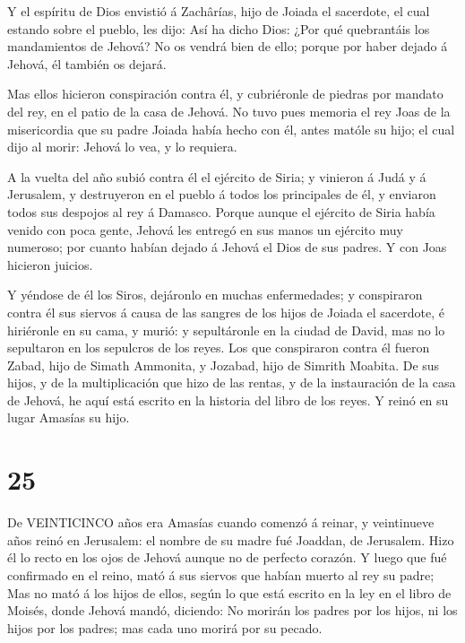  Y el espíritu de Dios envistió á Zachârías, hijo de Joiada
el sacerdote, el cual estando sobre el pueblo, les dijo: Así ha dicho
Dios: ¿Por qué quebrantáis los mandamientos de Jehová? No os vendrá bien
de ello; porque por haber dejado á Jehová, él también os dejará.

 Mas ellos hicieron conspiración contra él, y cubriéronle
de piedras por mandato del rey, en el patio de la casa de Jehová.
 No tuvo pues memoria el rey Joas de la misericordia que su
padre Joiada había hecho con él, antes matóle su hijo; el cual dijo al
morir: Jehová lo vea, y lo requiera.

 A la vuelta del año subió contra él el ejército de Siria;
y vinieron á Judá y á Jerusalem, y destruyeron en el pueblo á todos los
principales de él, y enviaron todos sus despojos al rey á Damasco.
 Porque aunque el ejército de Siria había venido con poca
gente, Jehová les entregó en sus manos un ejército muy numeroso; por
cuanto habían dejado á Jehová el Dios de sus padres. Y con Joas hicieron
juicios.

 Y yéndose de él los Siros, dejáronlo en muchas
enfermedades; y conspiraron contra él sus siervos á causa de las sangres
de los hijos de Joiada el sacerdote, é hiriéronle en su cama, y murió: y
sepultáronle en la ciudad de David, mas no lo sepultaron en los
sepulcros de los reyes.  Los que conspiraron contra él
fueron Zabad, hijo de Simath Ammonita, y Jozabad, hijo de Simrith
Moabita.  De sus hijos, y de la multiplicación que hizo de
las rentas, y de la instauración de la casa de Jehová, he aquí está
escrito en la historia del libro de los reyes. Y reinó en su lugar
Amasías su hijo.

\hypertarget{section-24}{%
\section{25}\label{section-24}}

 De VEINTICINCO años era Amasías cuando comenzó á reinar, y
veintinueve años reinó en Jerusalem: el nombre de su madre fué Joaddan,
de Jerusalem.  Hizo él lo recto en los ojos de Jehová aunque
no de perfecto corazón.  Y luego que fué confirmado en el
reino, mató á sus siervos que habían muerto al rey su padre;
 Mas no mató á los hijos de ellos, según lo que está escrito
en la ley en el libro de Moisés, donde Jehová mandó, diciendo: No
morirán los padres por los hijos, ni los hijos por los padres; mas cada
uno morirá por su pecado.

